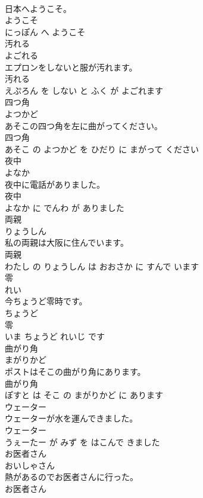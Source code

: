 \documentclass[8pt]{extreport}
\begin{document}
\begin{CJK}{UTF8}{min}
\\	日本へようこそ。	
\\	ようこそ 
\\	にっぽん へ ようこそ			
\\	汚れる	
\\	よごれる			
\\	エプロンをしないと服が汚れます。	
\\	汚れる 
\\	えぷろん を しない と ふく が よごれます			
\\	四つ角	
\\	よつかど			
\\	あそこの四つ角を左に曲がってください。	
\\	四つ角 
\\	あそこ の よつかど を ひだり に まがって ください			
\\	夜中	
\\	よなか			
\\	夜中に電話がありました。	
\\	夜中 
\\	よなか に でんわ が ありました			
\\	両親	
\\	りょうしん			
\\	私の両親は大阪に住んでいます。	
\\	両親 
\\	わたし の りょうしん は おおさか に すんで います			
\\	零	
\\	れい			
\\	今ちょうど零時です。	
\\	ちょうど 
\\	零 
\\	いま ちょうど れいじ です			
\\	曲がり角	
\\	まがりかど			
\\	ポストはそこの曲がり角にあります。	
\\	曲がり角 
\\	ぽすと は そこ の まがりかど に あります			
\\	ウェーター	
\\	ウェーターが水を運んできました。	
\\	ウェーター 
\\	うぇーたー が みず を はこんで きました			
\\	お医者さん	
\\	おいしゃさん			
\\	熱があるのでお医者さんに行った。	
\\	お医者さん 

\end{CJK}
\end{document}
